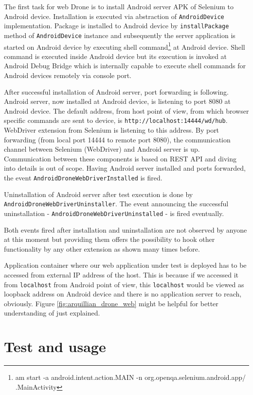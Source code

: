 \documentclass[12pt,final,oneside]{fithesis}
\begin{document}
The first task for web Drone is to install Android server APK of Selenium to Android device. Installation is executed via abstraction of \texttt{AndroidDevice} implementation. Package is installed to Android device by \texttt{installPackage} method of \texttt{AndroidDevice} instance and subsequently the server application is started on Android device by executing shell command\footnote{am start -a android.intent.action.MAIN -n org.openqa.selenium.android.app/ .MainActivity} at Android device. Shell command is executed inside Android device but its execution is invoked at Android Debug Bridge which is internally capable to execute shell commands for Android devices remotely via console port.

After successful installation of Android server, port forwarding is following. Android server, now installed at Android device, is listening to port 8080 at Android device. The default address, from host point of view, from which browser specific commands are sent to device, is \texttt{http://localhost:14444/wd/hub}. WebDriver extension from Selenium is listening to this address. By port forwarding (from local port 14444 to remote port 8080), the communication channel between Selenium (WebDriver) and Android server is up. Communication between these components is based on REST API and diving into details is out of scope. Having Android server installed and ports forwarded, the event \texttt{AndroidDroneWebDriverInstalled} is fired.

Uninstallation of Android server after test execution is done by \texttt{AndroidDroneWebDriverUninstaller}. The event announcing the successful uninstallation - \texttt{AndroidDroneWebDriverUninstalled} - is fired eventually.

Both events fired after installation and uninstallation are not observed by anyone at this moment but providing them offers the possibility to hook other functionality by any other extension as shown many times before.

Application container where our web application under test is deployed has to be accessed from external IP address of the host. This is because if we accessed it from \texttt{localhost} from Android point of view, this \texttt{localhost} would be viewed as loopback address on Android device and there is no application server to reach, obviously. Figure \ref{fig:arquillian_drone_web} might be helpful for better understanding of just explained.

\section{Test and usage}
\end{document}
